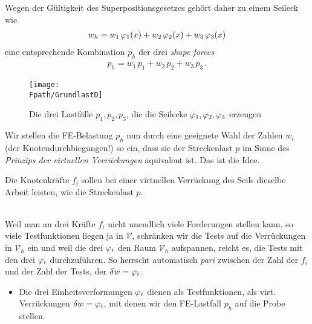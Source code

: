 Wegen der G\"{u}ltigkeit des Superpositionsgesetzes geh\"{o}rt daher zu einem Seileck wie
\begin{align}
 w_{h} = w_1\, \varphi_1(x) + w_2\, \varphi_2(x) + w_3 \,\varphi_3(x)
\end{align}
eine entsprechende Kombination $p_h$ der drei {\em shape forces\/}
\begin{align}
 p_{h} = w_1\, p_1 + w_2\,  p_2 + w_3\, p_3 \,.
\end{align}

\begin{figure}[tbp] \centering
\if {} \sidecaption \fi
\texttt{[image: \\Fpath/GrundlastD]}
\caption{Die drei Lastf\"{a}lle $p_1, p_2, p_3$, die die Seilecke $\varphi_1, \varphi_2,
\varphi_3$ erzeugen} \label{GrundlastD}
\end{figure}%
Wir stellen die FE-Belastung $p_{h}$ nun durch eine geeignete Wahl der Zahlen $w_i$ (der Knotendurchbiegungen!) so ein, dass sie der Streckenlast $p$ im Sinne des {\em Prinzips der virtuellen Verr\"{u}ckungen\/} \"{a}quivalent ist. Das ist die Idee.\\

\hspace*{-12pt}\colorbox{highlightBlue}{\parbox{0.98\textwidth}{ Die Knotenkr\"{a}fte $f_i$ sollen bei einer
virtuellen Verr\"{u}ckung des Seils dieselbe Arbeit leisten, wie die Streckenlast $p$.}}\\

Weil man an drei Kr\"{a}fte $f_i$ nicht unendlich viele Forderungen stellen kann, so viele Testfunktionen liegen ja in $\mathcal{V}$, schr\"{a}nken wir die Tests auf die Verr\"{u}ckungen in $\mathcal{V}_h$ ein und weil die drei $\varphi_i$ den Raum $\mathcal{V}_h$ aufspannen, reicht es, die Tests mit den drei $\varphi_i$ durchzuf\"{u}hren. So herrscht automatisch {\em pari\/} zwischen der Zahl der $f_i$ und der Zahl der Tests, der $\delta w = \varphi_i$.\\

\begin{itemize}
\item  Die drei Einheitsverformungen $\varphi_i$ dienen als
Testfunktionen, als virt. Verr\"{u}ckungen $\delta w = \varphi_i$, mit denen wir den FE-Lastfall $p_h$ auf die Probe stellen.
\end{itemize}

